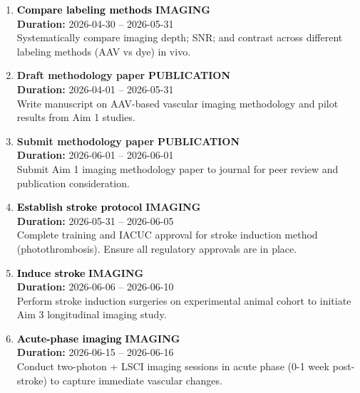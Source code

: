 \documentclass[a4paper]{article}
\newcommand{\cellcolor}[2]{\colorbox{#1}{#2}}
\begin{document}
\begin{enumerate}[leftmargin=0.3cm, itemsep=0.3em, parsep=0.1em, topsep=0.1em]
    \item \textcolor{black}{\textbf{\Large Compare labeling methods}}
          \hfill \cellcolor{black!15}{\textbf{\small IMAGING}}
          \\ \textcolor{black!60}{\textbf{Duration:} 2026-04-30 -- 2026-05-31} \\ \textcolor{black!80}{\small Systematically compare imaging depth; SNR; and contrast across different labeling methods (AAV vs dye) in vivo.}

    \item \textcolor{researchout}{\textbf{\Large Draft methodology paper}}
          \hfill \cellcolor{researchout!15}{\textbf{\small PUBLICATION}}
          \\ \textcolor{black!60}{\textbf{Duration:} 2026-04-01 -- 2026-05-31} \\ \textcolor{black!80}{\small Write manuscript on AAV-based vascular imaging methodology and pilot results from Aim 1 studies.}

    \item \textcolor{researchout}{\textbf{\Large Submit methodology paper}}
          \hfill \cellcolor{researchout!15}{\textbf{\small PUBLICATION}}
          \\ \textcolor{black!60}{\textbf{Duration:} 2026-06-01 -- 2026-06-01} \\ \textcolor{black!80}{\small Submit Aim 1 imaging methodology paper to journal for peer review and publication consideration.}

    \item \textcolor{black}{\textbf{\Large Establish stroke protocol}}
          \hfill \cellcolor{black!15}{\textbf{\small IMAGING}}
          \\ \textcolor{black!60}{\textbf{Duration:} 2026-05-31 -- 2026-06-05} \\ \textcolor{black!80}{\small Complete training and IACUC approval for stroke induction method (photothrombosis). Ensure all regulatory approvals are in place.}

    \item \textcolor{black}{\textbf{\Large Induce stroke}}
          \hfill \cellcolor{black!15}{\textbf{\small IMAGING}}
          \\ \textcolor{black!60}{\textbf{Duration:} 2026-06-06 -- 2026-06-10} \\ \textcolor{black!80}{\small Perform stroke induction surgeries on experimental animal cohort to initiate Aim 3 longitudinal imaging study.}

    \item \textcolor{black}{\textbf{\Large Acute-phase imaging}}
          \hfill \cellcolor{black!15}{\textbf{\small IMAGING}}
          \\ \textcolor{black!60}{\textbf{Duration:} 2026-06-15 -- 2026-06-16} \\ \textcolor{black!80}{\small Conduct two-photon + LSCI imaging sessions in acute phase (0-1 week post-stroke) to capture immediate vascular changes.}


\end{enumerate}
\end{document}
